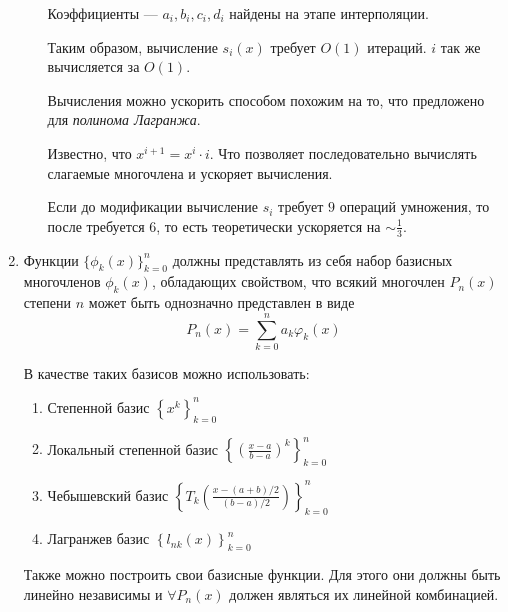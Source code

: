 \documentclass[12pt]{article}
\begin{document}
\begin{enumerate}
\begin{enumerate}
		Коэффициенты --- $a_{i}, b_{i}, c_{i}, d_{i}$ найдены на этапе интерполяции.
		
		Таким образом, вычисление $s_i(x)$ требует $O(1)$ итераций.
		$i$ так же вычисляется за $O(1)$. 
		
		Вычисления можно ускорить способом похожим на то, что предложено для \textit{полинома Лагранжа}. 
		
		Известно, что $x^{i+1} = x^i \cdot i$. Что позволяет последовательно вычислять слагаемые многочлена и ускоряет вычисления.
		
		Если до модификации вычисление $s_i$ требует $9$ операций умножения, то после требуется $6$, то есть теоретически ускоряется на $\sim\frac{1}{3}$.
		\end{enumerate}
	\item Функции $\{\phi_k(x)\}_{k=0}^{n}$ должны представлять из себя набор базисных многочленов $\phi_k(x)$, обладающих свойством, что всякий многочлен $P_n(x)$ степени $n$ может быть однозначно представлен в виде 
	$$ P_{n}(x)=\sum_{k=0}^{n} a_{k} \varphi_{k}(x) $$
	
	В качестве таких базисов можно использовать:
	\begin{enumerate}
		\item Степенной базис $\left\{x^{k}\right\}_{k=0}^{n}$
		\item Локальный степенной базис $\left\{\left(\frac{x-a}{b-a}\right)^{k}\right\}_{k=0}^{n}$ 
		\item Чебышевский базис
		$ \left\{T_{k}\left(\frac{x-(a+b) / 2}{(b-a) / 2}\right)\right\}_{k=0}^{n} $
		\item Лагранжев базис $\left\{l_{n k}(x)\right\}_{k=0}^{n}$ 
	\end{enumerate}

	Также можно построить свои базисные функции. Для этого они должны быть линейно независимы и $\forall P_n(x)$ должен являться их линейной комбинацией.
	\end{enumerate}
\end{document}
